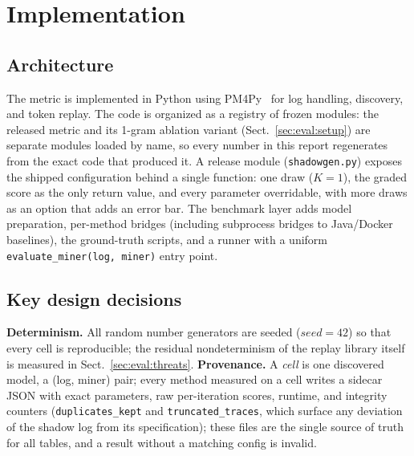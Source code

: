 \documentclass[runningheads]{llncs}
\begin{document}
\section{Implementation}
\label{sec:impl}
\subsection{Architecture}
\label{sec:impl:arch}
The metric is implemented in Python using PM4Py~\cite{berti2023pm4pysi} for log handling, discovery, and token replay. The code is organized as a registry of frozen modules: the released metric and its 1-gram ablation variant (Sect.~\ref{sec:eval:setup}) are separate modules loaded by name, so every number in this report regenerates from the exact code that produced it. A release module (\texttt{shadowgen.py}) exposes the shipped configuration behind a single function: one draw ($K{=}1$), the graded score as the only return value, and every parameter overridable, with more draws as an option that adds an error bar. The benchmark layer adds model preparation, per-method bridges (including subprocess bridges to Java/Docker baselines), the ground-truth scripts, and a runner with a uniform \texttt{evaluate\_miner(log, miner)} entry point.

\subsection{Key design decisions}
\label{sec:impl:decisions}
\textbf{Determinism.} All random number generators are seeded ($\mathit{seed}{=}42$) so that every cell is reproducible; the residual nondeterminism of the replay library itself is measured in Sect.~\ref{sec:eval:threats}. \textbf{Provenance.} A \emph{cell} is one discovered model, a (log, miner) pair; every method measured on a cell writes a sidecar JSON with exact parameters, raw per-iteration scores, runtime, and integrity counters (\texttt{duplicates\_kept} and \texttt{truncated\_traces}, which surface any deviation of the shadow log from its specification); these files are the single source of truth for all tables, and a result without a matching config is invalid.
\end{document}
